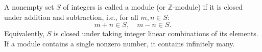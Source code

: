 A nonempty set $S$ of integers is called a module (or $\mathbb{Z}$-module) if it is closed under addition and subtraction, i.e., for all $m, n \in S$:
$$m + n \in S, \quad m - n \in S.$$
Equivalently, $S$ is closed under taking integer linear combinations of its elements. If a module contains a single nonzero number, it contains infinitely many.
